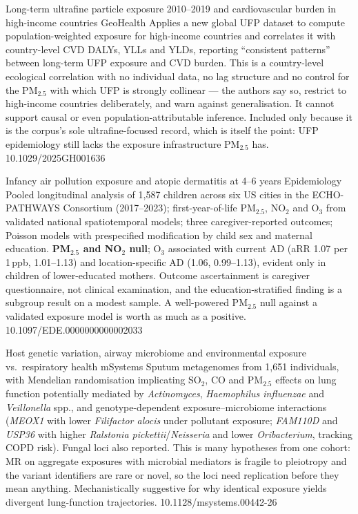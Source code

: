 \documentclass[10pt]{article}
\begin{document}
{Long-term ultrafine particle exposure 2010--2019 and cardiovascular burden in high-income countries}
{GeoHealth}
{Applies a new global UFP dataset to compute population-weighted exposure for high-income
countries and correlates it with country-level CVD DALYs, YLLs and YLDs, reporting
``consistent patterns'' between long-term UFP exposure and CVD burden. This is a
country-level ecological correlation with no individual data, no lag structure and no
control for the PM$_{2.5}$ with which UFP is strongly collinear --- the authors say so,
restrict to high-income countries deliberately, and warn against generalisation. It
cannot support causal or even population-attributable inference. Included only because it
is the corpus's sole ultrafine-focused record, which is itself the point: UFP
epidemiology still lacks the exposure infrastructure PM$_{2.5}$ has.}
{10.1029/2025GH001636}


{Infancy air pollution exposure and atopic dermatitis at 4--6 years}
{Epidemiology}
{Pooled longitudinal analysis of 1{,}587 children across six US cities in the
ECHO-PATHWAYS Consortium (2017--2023); first-year-of-life PM$_{2.5}$, NO$_2$ and O$_3$
from validated national spatiotemporal models; three caregiver-reported outcomes; Poisson
models with prespecified modification by child sex and maternal education.
\textbf{PM$_{2.5}$ and NO$_2$ null}; O$_3$ associated with current AD (aRR 1.07 per
1\,ppb, 1.01--1.13) and location-specific AD (1.06, 0.99--1.13), evident only in children
of lower-educated mothers. Outcome ascertainment is caregiver questionnaire, not clinical
examination, and the education-stratified finding is a subgroup result on a modest
sample. A well-powered PM$_{2.5}$ null against a validated exposure model is worth as
much as a positive.}
{10.1097/EDE.0000000000002033}

{Host genetic variation, airway microbiome and environmental exposure vs.\ respiratory health}
{mSystems}
{Sputum metagenomes from 1{,}651 individuals, with Mendelian randomisation implicating
SO$_2$, CO and PM$_{2.5}$ effects on lung function potentially mediated by
\textit{Actinomyces}, \textit{Haemophilus influenzae} and \textit{Veillonella} spp., and
genotype-dependent exposure--microbiome interactions (\textit{MEOX1} with lower
\textit{Filifactor alocis} under pollutant exposure; \textit{FAM110D} and \textit{USP36}
with higher \textit{Ralstonia pickettii}/\textit{Neisseria} and lower
\textit{Oribacterium}, tracking COPD risk). Fungal loci also reported. This is many
hypotheses from one cohort: MR on aggregate exposures with microbial mediators is fragile
to pleiotropy and the variant identifiers are rare or novel, so the loci need replication
before they mean anything. Mechanistically suggestive for why identical exposure yields
divergent lung-function trajectories.}
{10.1128/msystems.00442-26}
\end{document}
